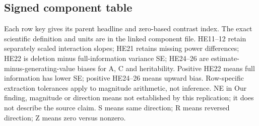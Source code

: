 \documentclass[11pt]{article}
\begin{document}
\subsection{Signed component table}
Each row key gives its parent headline and zero-based contrast index. The exact scientific definition and units are in the linked component file. HE11--12 retain separately scaled interaction slopes; HE21 retains missing power differences; HE22 is deletion minus full-information variance SE; HE24--26 are estimate-minus-generating-value biases for A, C and heritability. Positive HE22 means full information has lower SE; positive HE24--26 means upward bias. Row-specific extraction tolerances apply to magnitude arithmetic, not inference. NE in Our finding, magnitude or direction means not established by this replication; it does not describe the source claim. S means same direction; R means reversed direction; Z means zero versus nonzero.
\end{document}
